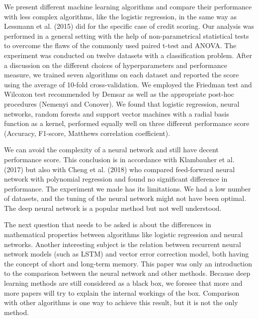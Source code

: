 \documentclass[a4paper,12pt]{article}
\numberwithin{equation}{section}
\begin{document}
We present different machine learning algorithms and compare their performance with less complex algorithms, like the logistic regression, in the same way as Lessmann et al. (2015) did for the specific case of credit scoring. Our analysis was performed in a general setting with the help of non-parametrical statistical tests to overcome the flaws of the commonly used paired t-test and ANOVA. The experiment was conducted on twelve datasets with a classification problem. After a discussion on the different choices of hyperparameters and performance measure, we trained seven algorithms on each dataset and reported the score using the average of 10-fold cross-validation. We employed the Friedman test and Wilcoxon test recommended by Demsar as well as the appropriate post-hoc procedures (Nemenyi and Conover). We found that logistic regression, neural networks, random forests and support vector machines with a radial basis function as a kernel, performed equally well on three different performance score (Accuracy, F1-score, Matthews correlation coefficient). \par
We can avoid the complexity of a neural network and still have decent performance score. This conclusion is in accordance with Klambauher et al. (2017) but also with Cheng et al. (2018) who compared feed-forward neural network with polynomial regression and found no significant difference in performance. The experiment we made has its limitations. We had a low number of datasets, and the tuning of the neural network might not have been optimal. The deep neural network is a popular method but not well understood. \par
The next question that needs to be asked is about the differences in mathematical properties between algorithms like logistic regression and neural networks. Another interesting subject is the relation between recurrent neural network models (such as LSTM) and vector error correction model, both having the concept of short and long-term memory. This paper was only an introduction to the comparison between the neural network and other methods. Because deep learning methods are still considered as a black box, we foresee that more and more papers will try to explain the internal workings of the box. Comparison with other algorithms is one way to achieve this result, but it is not the only method.

\newpage

\singlespacing

\nocite{*}



\end{document}
